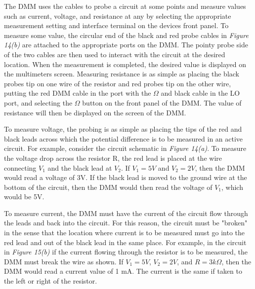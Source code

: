 \documentclass[12pt]{article}
\begin{document}
The DMM uses the cables to probe a circuit at some points and measure values such as current, voltage, and resistance at any by selecting the appropriate measurement setting and interface terminal on the devices front panel. To measure some value, the circular end of the black and red probe cables in \textit{Figure 14(b)} are attached to the appropriate ports on the DMM. The pointy probe side of the two cables are then used to interact with the circuit at the desired location. When the measurement is completed, the desired value is displayed on the multimeters screen. Measuring resistance is as simple as placing the black probes tip on one wire of the resistor and red probes tip on the other wire, putting the red DMM cable in the port with the $\Omega$ and black cable in the LO port, and selecting the $\Omega$ button on the front panel of the DMM. The value of resistance will then be displayed on the screen of the DMM.

To measure voltage, the probing is as simple as placing the tips of the red and black leads across which the potential difference is to be measured in an active circuit. For example, consider the circuit schematic in \textit{Figure 14(a)}. To measure the voltage drop across the resistor R, the red lead is placed at the wire connecting $V_1$ and the black lead at $V_2$. If $V_1 = 5V$ and $V_2 = 2V$, then the DMM would read a voltage of 3V. If the black lead is moved to the ground wire at the bottom of the circuit, then the DMM would then read the voltage of $V_1$, which would be 5V.

To measure current, the DMM must have the current of the circuit flow through the leads and back into the circuit. For this reason, the circuit must be "broken" in the sense that the location where current is to be measured must go into the red lead and out of the black lead in the same place. For example, in the circuit in \textit{Figure 15(b)} if the current flowing through the resistor is to be measured, the DMM must break the wire as shown. If $V_1 = 5V$, $V_2 = 2V$, and $R = 3k\Omega$, then the DMM would read a current value of 1 mA. The current is the same if taken to the left or right of the resistor.
\end{document}
